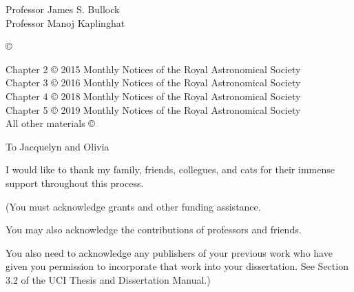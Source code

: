 




\othercommitteemembers
{
  Professor James S. Bullock\\
  Professor Manoj Kaplinghat
}


\copyrightdeclaration
{
  {\copyright} {\Degreeyear} \Authorname
}

 \prepublishedcopyrightdeclaration
 {
 	Chapter 2 {\copyright} 2015 Monthly Notices of the Royal
        Astronomical Society \\
        Chapter 3 {\copyright} 2016 Monthly Notices of the Royal
        Astronomical Society \\
        Chapter 4 {\copyright} 2018 Monthly Notices of the Royal
        Astronomical Society \\
        Chapter 5 {\copyright} 2019 Monthly Notices of the Royal
        Astronomical Society \\
 	All other materials {\copyright} {\Degreeyear} \Authorname
 }

\dedications
{ 
  To Jacquelyn and Olivia
}

\acknowledgments
{
  I would like to thank my family, friends, collegues, and cats for
  their immense support throughout this process.
  
  (You must acknowledge grants and other funding assistance. 
  
  You may also acknowledge the contributions of professors and
  friends.
  
  You also need to acknowledge any publishers of your previous
  work who have given you permission to incorporate that work
  into your dissertation. See Section 3.2 of the UCI Thesis and
  Dissertation Manual.)
}


